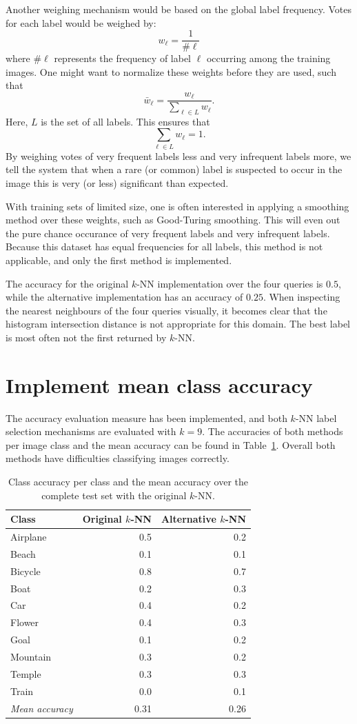 \documentclass[a4paper,10pt,twoside]{article}
\begin{document}
Another weighing mechanism would be based on the global label frequency.  Votes for each label would be weighed by: \[ w_\ell = \frac{1}{\#\ell} \] where $\#\ell$ represents the frequency of label $\ell$ occurring among the training images.  One might want to normalize these weights before they are used, such that \[\bar w_\ell = \frac{w_\ell}{\sum_{\ell \in L} w_\ell}. \] Here, $L$ is the set of all labels.  This ensures that \[\sum_{\ell \in L} w_\ell = 1.\] By weighing votes of very frequent labels less and very infrequent labels more, we tell the system that when a rare (or common) label is suspected to occur in the image this is very (or less) significant than expected.

With training sets of limited size, one is often interested in applying a smoothing method over these weights, such as Good-Turing smoothing.  This will even out the pure chance occurance of very frequent labels and very infrequent labels.  Because this dataset has equal frequencies for all labels, this method is not applicable, and only the first method is implemented.

The accuracy for the original $k$-NN implementation over the four queries is $0.5$, while the alternative implementation has an accuracy of $0.25$.  When inspecting the nearest neighbours of the four queries visually, it becomes clear that the histogram intersection distance is not appropriate for this domain.  The best label is most often not the first returned by $k$-NN.

\section{Implement mean class accuracy}
The accuracy evaluation measure has been implemented, and both $k$-NN label selection mechanisms are evaluated with $k=9$.  The accuracies of both methods per image class and the mean accuracy can be found in Table~\ref{t:classacc}.  Overall both methods have difficulties classifying images correctly.  

\begin{table}
  \centering
  \begin{tabular}{l|rr}
    Class & Original $k$-NN & Alternative $k$-NN \\
    \hline
    Airplane & 0.5 & 0.2 \\
    Beach & 0.1 & 0.1 \\
    Bicycle & 0.8 & 0.7 \\
    Boat & 0.2 & 0.3 \\
    Car & 0.4 & 0.2 \\
    Flower & 0.4 & 0.3 \\
    Goal & 0.1 & 0.2 \\
    Mountain & 0.3 & 0.2 \\
    Temple & 0.3 & 0.3 \\
    Train & 0.0 & 0.1 \\
    \hline
    \emph{Mean accuracy} & 0.31 & 0.26
  \end{tabular}
  \caption{Class accuracy per class and the mean accuracy over the complete test set with the original $k$-NN.}
  \label{t:classacc}
\end{table}
\end{document}
